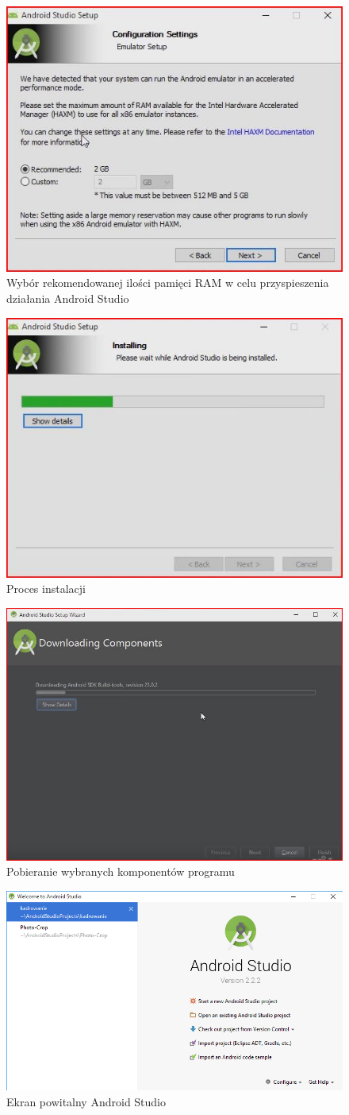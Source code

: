 \begin{figure}[h!]
\centering
\includegraphics[width=0.5\linewidth]{fig/i3}
\caption{Wybór rekomendowanej ilości pamięci RAM w celu przyspieszenia działania Android Studio}
\label{fig:13}
\end{figure}

\begin{figure}[h!]
\centering
\includegraphics[width=0.5\linewidth]{fig/i4}
\caption{Proces instalacji}
\label{fig:14}
\end{figure}

\begin{figure}[h!]
\centering
\includegraphics[width=0.5\linewidth]{fig/i5}
\caption{Pobieranie wybranych komponentów programu}
\label{fig:15}
\end{figure}

\begin{figure}[h!]
\centering
\includegraphics[width=0.7\linewidth]{fig/i6}
\caption{Ekran powitalny Android Studio}
\label{fig:16}
\end{figure}




